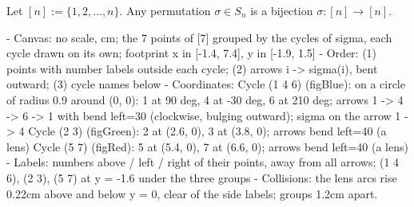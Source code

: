 \begin{content}
Let $[n] := \{1, 2, \dots, n\}$. Any permutation $\sigma \in S_n$ is a bijection $\sigma \colon [n] \to [n]$.

\begin{hidden}
- Canvas: no scale, cm; the 7 points of [7] grouped by the cycles of sigma, each cycle drawn on its own;
  footprint x in [-1.4, 7.4], y in [-1.9, 1.5]
- Order: (1) points with number labels outside each cycle; (2) arrows i -> sigma(i), bent outward; (3) cycle names below
- Coordinates:
  Cycle (1 4 6) (figBlue): on a circle of radius 0.9 around (0, 0): 1 at 90 deg, 4 at -30 deg, 6 at 210 deg;
    arrows 1 -> 4 -> 6 -> 1 with bend left=30 (clockwise, bulging outward); sigma on the arrow 1 -> 4
  Cycle (2 3) (figGreen): 2 at (2.6, 0), 3 at (3.8, 0); arrows bend left=40 (a lens)
  Cycle (5 7) (figRed): 5 at (5.4, 0), 7 at (6.6, 0); arrows bend left=40 (a lens)
- Labels: numbers above / left / right of their points, away from all arrows;
  (1 4 6), (2 3), (5 7) at y = -1.6 under the three groups
- Collisions: the lens arcs rise 0.22cm above and below y = 0, clear of the side labels; groups 1.2cm apart.
\end{hidden}
\begin{center}
\end{center}
\end{content}

